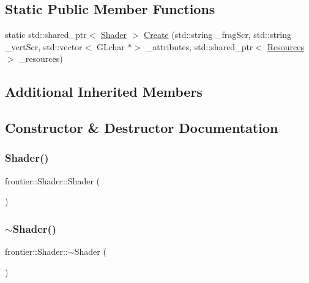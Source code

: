 \subsection*{Static Public Member Functions}
\begin{DoxyCompactItemize}
\item 
static std\+::shared\+\_\+ptr$<$ \hyperlink{classfrontier_1_1_shader}{Shader} $>$ \hyperlink{classfrontier_1_1_shader_add4c33f617fa62cc1d0757a875bacd01}{Create} (std\+::string \+\_\+frag\+Scr, std\+::string \+\_\+vert\+Scr, std\+::vector$<$ G\+Lchar $\ast$$>$ \+\_\+attributes, std\+::shared\+\_\+ptr$<$ \hyperlink{classfrontier_1_1_resources}{Resources} $>$ \+\_\+resources)
\end{DoxyCompactItemize}
\subsection*{Additional Inherited Members}


\subsection{Constructor \& Destructor Documentation}
\mbox{\label{classfrontier_1_1_shader_ab428b55b218efdedc1dc6445e43a286f}} 
\subsubsection{\texorpdfstring{Shader()}{Shader()}}
{\footnotesize\ttfamily frontier\+::\+Shader\+::\+Shader (\begin{DoxyParamCaption}{ }\end{DoxyParamCaption})}

\mbox{\label{classfrontier_1_1_shader_a447710cc5dee2e490e64d86201b114d7}} 
\subsubsection{\texorpdfstring{$\sim$\+Shader()}{~Shader()}}
{\footnotesize\ttfamily frontier\+::\+Shader\+::$\sim$\+Shader (\begin{DoxyParamCaption}{ }\end{DoxyParamCaption})}




